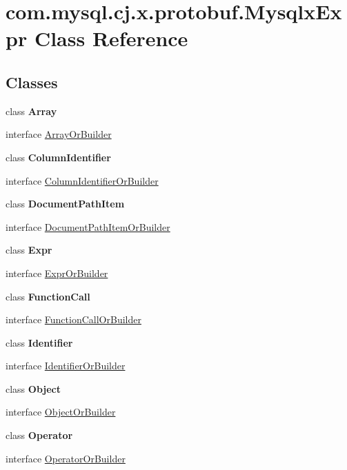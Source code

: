 \hypertarget{classcom_1_1mysql_1_1cj_1_1x_1_1protobuf_1_1_mysqlx_expr}{}\section{com.\+mysql.\+cj.\+x.\+protobuf.\+Mysqlx\+Expr Class Reference}
\label{classcom_1_1mysql_1_1cj_1_1x_1_1protobuf_1_1_mysqlx_expr}
\subsection*{Classes}
\begin{DoxyCompactItemize}
\item 
class {\bfseries Array}
\item 
interface \mbox{\hyperlink{interfacecom_1_1mysql_1_1cj_1_1x_1_1protobuf_1_1_mysqlx_expr_1_1_array_or_builder}{Array\+Or\+Builder}}
\item 
class {\bfseries Column\+Identifier}
\item 
interface \mbox{\hyperlink{interfacecom_1_1mysql_1_1cj_1_1x_1_1protobuf_1_1_mysqlx_expr_1_1_column_identifier_or_builder}{Column\+Identifier\+Or\+Builder}}
\item 
class {\bfseries Document\+Path\+Item}
\item 
interface \mbox{\hyperlink{interfacecom_1_1mysql_1_1cj_1_1x_1_1protobuf_1_1_mysqlx_expr_1_1_document_path_item_or_builder}{Document\+Path\+Item\+Or\+Builder}}
\item 
class {\bfseries Expr}
\item 
interface \mbox{\hyperlink{interfacecom_1_1mysql_1_1cj_1_1x_1_1protobuf_1_1_mysqlx_expr_1_1_expr_or_builder}{Expr\+Or\+Builder}}
\item 
class {\bfseries Function\+Call}
\item 
interface \mbox{\hyperlink{interfacecom_1_1mysql_1_1cj_1_1x_1_1protobuf_1_1_mysqlx_expr_1_1_function_call_or_builder}{Function\+Call\+Or\+Builder}}
\item 
class {\bfseries Identifier}
\item 
interface \mbox{\hyperlink{interfacecom_1_1mysql_1_1cj_1_1x_1_1protobuf_1_1_mysqlx_expr_1_1_identifier_or_builder}{Identifier\+Or\+Builder}}
\item 
class {\bfseries Object}
\item 
interface \mbox{\hyperlink{interfacecom_1_1mysql_1_1cj_1_1x_1_1protobuf_1_1_mysqlx_expr_1_1_object_or_builder}{Object\+Or\+Builder}}
\item 
class {\bfseries Operator}
\item 
interface \mbox{\hyperlink{interfacecom_1_1mysql_1_1cj_1_1x_1_1protobuf_1_1_mysqlx_expr_1_1_operator_or_builder}{Operator\+Or\+Builder}}
\end{DoxyCompactItemize}
